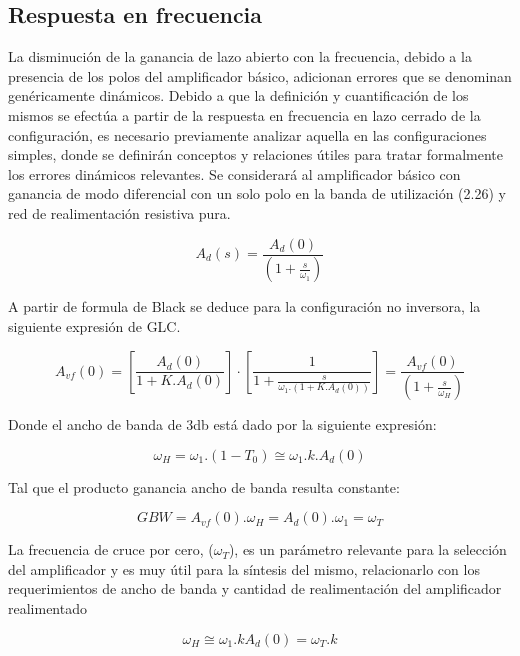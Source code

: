 \subsection{Respuesta en frecuencia}
\noindent La disminución de la ganancia de lazo abierto con la frecuencia, debido a la presencia de los polos del amplificador básico, adicionan errores que se denominan genéricamente dinámicos. Debido a que la definición y cuantificación de los mismos se efectúa a partir de la respuesta en frecuencia en lazo cerrado de la configuración, es necesario previamente analizar aquella en las configuraciones simples, donde se definirán conceptos y relaciones útiles para tratar formalmente los errores dinámicos relevantes. Se considerará al amplificador básico con ganancia de modo diferencial con un solo polo en la banda de utilización (2.26) y red de realimentación resistiva pura.

\begin{equation} \tag{2.26}
A_d(s) = \frac{A_d(0)}{\left( 1 + \frac{s}{\omega_1} \right)}
\end{equation}

A partir de formula de Black se deduce para la configuración no inversora, la siguiente expresión de GLC.

\begin{equation} \tag{2.27}
A_{vf}(0) = \left[ \frac{A_d(0)}{1 + K.A_d(0)} \right] \cdot \left[ \frac{1}{1 + \frac{s}{\omega_1.(1+K.A_d(0))}} \right] = \frac{A_{vf}(0)}{\left( 1 + \frac{s}{\omega_H} \right)}
\end{equation}

Donde el ancho de banda de 3db está dado por la siguiente expresión:

\begin{equation} \tag{2.28}
\omega_H = \omega_1.(1-T_0) \cong \omega_1.k.A_d(0)
\end{equation}

Tal que el producto ganancia ancho de banda resulta constante:

\begin{equation} \tag{2.29}
GBW = A_{vf}(0).\omega_H = A_d(0).\omega_1 = \omega_T
\end{equation}

La frecuencia de cruce por cero, ($\omega_T$), es un parámetro relevante para la selección del amplificador y es muy útil para la síntesis del mismo, relacionarlo con los requerimientos de ancho de banda y cantidad de realimentación del amplificador realimentado

\begin{equation} \tag{2.30}
\omega_H \cong \omega_1.k A_d(0) = \omega_T.k
\end{equation}

